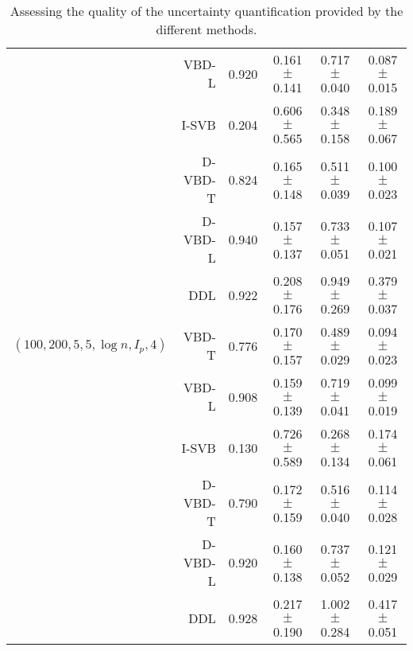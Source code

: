 \documentclass[11pt]{article}
\numberwithin{equation}{section}
\begin{document}
\begin{table}
{\begin{tabular}{l|r|c|ccc}
                                                    & VBD-L   & 0.920 & 0.161  $\pm$  0.141 & 0.717  $\pm$  0.040 & 0.087  $\pm$  0.015\\
                                                    & I-SVB   & 0.204 & 0.606  $\pm$  0.565 & 0.348  $\pm$  0.158 & 0.189  $\pm$  0.067\\
                                                    & D-VBD-T & 0.824 & 0.165  $\pm$  0.148 & 0.511  $\pm$  0.039 & 0.100  $\pm$  0.023\\
                                                    & D-VBD-L & 0.940 & 0.157  $\pm$  0.137 & 0.733  $\pm$  0.051 & 0.107  $\pm$  0.021\\
                                                    & DDL     & 0.922 & 0.208  $\pm$  0.176 & 0.949  $\pm$  0.269 & 0.379  $\pm$  0.037\\\hline
$(100 , 200 , 5  , 5  , \log n, I_p, 4)$            & VBD-T   & 0.776 & 0.170  $\pm$  0.157 & 0.489  $\pm$  0.029 & 0.094  $\pm$  0.023\\
                                                    & VBD-L   & 0.908 & 0.159  $\pm$  0.139 & 0.719  $\pm$  0.041 & 0.099  $\pm$  0.019\\
                                                    & I-SVB   & 0.130 & 0.726  $\pm$  0.589 & 0.268  $\pm$  0.134 & 0.174  $\pm$  0.061\\
                                                    & D-VBD-T & 0.790 & 0.172  $\pm$  0.159 & 0.516  $\pm$  0.040 & 0.114  $\pm$  0.028\\
                                                    & D-VBD-L & 0.920 & 0.160  $\pm$  0.138 & 0.737  $\pm$  0.052 & 0.121  $\pm$  0.029\\
                                                    & DDL     & 0.928 & 0.217  $\pm$  0.190 & 1.002  $\pm$  0.284 & 0.417  $\pm$  0.051\\
\bottomrule
\end{tabular}
}
\caption{Assessing the quality of the uncertainty quantification provided by the different methods.}
\label{Tab:DD_multilevel}
\end{table}
\end{document}

